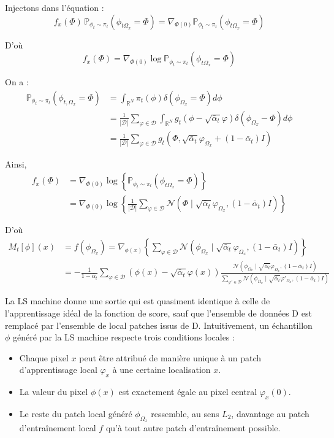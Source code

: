 \documentclass[a4paper,10pt]{article}
\theoremstyle{definition} %
\theoremstyle{definition} %
\theoremstyle{definition} %
\theoremstyle{definition} %
\begin{document}
Injectons dans l'équation :
\[ f_x(\Phi)\, \mathbb{P}_{\phi_t \sim \pi_t} (\phi_{t \Omega_x} = \Phi) = \nabla_{\Phi(0)} \mathbb{P}_{\phi_t \sim \pi_t} (\phi_{t \Omega_x} = \Phi) \]

D'où
\[ f_x(\Phi) = \nabla_{\Phi(0)} \log \mathbb{P}_{\phi_t \sim \pi_t} (\phi_{t\Omega_x} = \Phi) \]

On a :
\begin{align*}
\mathbb{P}_{\phi_t \sim \pi_t} (\phi_{t, \Omega_x} = \Phi) &= \int_{\mathbb{R}^N} \pi_t(\phi) \delta(\phi_{\Omega_x} = \Phi) d\phi \\
&= \frac{1}{|\mathcal{D}|} \sum\limits_{\varphi \in \mathcal{D}} \int_{\mathbb{R}^N} g_t(\phi - \sqrt{\bar \alpha_t} \varphi) \delta(\phi_{\Omega_x} - \Phi) d\phi \\
&= \frac{1}{|\mathcal{D}|} \sum\limits_{\varphi \in \mathcal{D}} g_t(\Phi, \sqrt{\bar \alpha_t} \varphi_{\Omega_x} + (1 - \bar \alpha_t) I)
\end{align*}

Ainsi,
\begin{align*}
    f_x(\Phi) &= \nabla_{\Phi(0)} \log \left\{\mathbb{P}_{\phi_t \sim \pi_t} (\phi_{t\Omega_x} = \Phi)\right\} \\
    &=\nabla_{\Phi(0)} \log \left\{ \frac{1}{|\mathcal{D}|} \sum\limits_{\varphi \in \mathcal{D}} \mathcal{N}(\Phi \mid \sqrt{\bar \alpha_t} \varphi_{\Omega_x}, (1 - \bar\alpha_t) I) \right\}
\end{align*}

D'où
\begin{align*}
M_t[\phi](x) &= f(\phi_{\Omega_x}) = \nabla_{\phi(x)} \left\{ \sum\limits_{\varphi \in \mathcal{D}} \mathcal{N}(\phi_{\Omega_x} \mid \sqrt{\bar \alpha_t} \varphi_{\Omega_x}, (1 - \bar \alpha_t) I) \right\} \\
&= -\frac{1}{1 - \bar \alpha_t} \sum\limits_{\varphi \in \mathcal{D}} \left(\phi(x) - \sqrt{\bar \alpha_t} \varphi(x)\right) \frac{\mathcal{N}(\phi_{\Omega_x} \mid \sqrt{\bar \alpha_t} \varphi_{\Omega_x}, (1 - \bar \alpha_t) I)}{\sum\limits_{\varphi' \in \mathcal{D}} \mathcal{N}(\phi_{\Omega_x} \mid \sqrt{\bar \alpha_t} \varphi'_{\Omega_x}, (1 - \bar \alpha_t) I)}
\end{align*} 

La LS machine donne une sortie qui est quasiment identique à celle de l'apprentissage idéal de la fonction de score, sauf que l'ensemble de données D est remplacé par l'ensemble de local patches issus de D. Intuitivement, un échantillon $\phi$ généré par la LS machine respecte trois conditions locales :
\begin{itemize}[topsep=-5pt]
    \item Chaque pixel $x$ peut être attribué de manière unique à un patch d'apprentissage local $\varphi_x$ à une certaine localisation $x$.
    \item La valeur du pixel $\phi(x)$ est exactement égale au pixel central $\varphi_x(0)$.
    \item Le reste du patch local généré $\phi_{\Omega_x}$ ressemble, au sens $L_2$, davantage au patch d'entraînement local $f$ qu'à tout autre patch d'entraînement possible.
\end{itemize}
\end{document}
